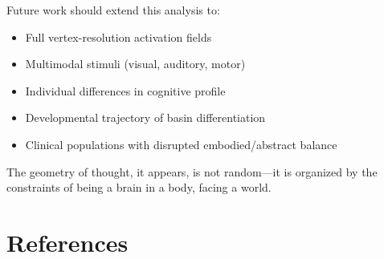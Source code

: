 \documentclass[12pt]{article}
\numberwithin{equation}{section}
\begin{document}
Future work should extend this analysis to:
\begin{itemize}
	\item Full vertex-resolution activation fields
	\item Multimodal stimuli (visual, auditory, motor)
	\item Individual differences in cognitive profile
	\item Developmental trajectory of basin differentiation
	\item Clinical populations with disrupted embodied/abstract balance
\end{itemize}

The geometry of thought, it appears, is not random---it is organized by the constraints of being a brain in a body, facing a world.

\section{References}



\end{document}
